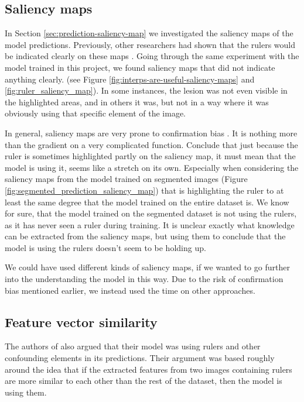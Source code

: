 \subsection{Saliency maps}
In Section \ref{sec:prediction-saliency-map} we investigated the saliency maps of the model predictions.
Previously, other researchers had shown that the rulers would be indicated clearly on these maps \cite{interps-are-useful}.
Going through the same experiment with the model trained in this project, we found saliency maps that did not indicate anything clearly. 
(see Figure \ref{fig:interps-are-useful-saliency-maps} and \ref{fig:ruler_saliency_map}).
In some instances, the lesion was not even visible in the highlighted areas,
and in others it was, but not in a way where it was obviously using that specific element of the image.

In general, saliency maps are very prone to confirmation bias \cite{sanity-checks-for-saliency,Grns2020FaithfulSM}.
It is nothing more than the gradient on a very complicated function.
Conclude that just because the ruler is sometimes highlighted partly on the saliency map,
it must mean that the model is using it, seems like a stretch on its own.
Especially when considering the saliency maps from the model trained on segmented images (Figure 
\ref{fig:segmented_prediction_saliency_map}) that is highlighting the ruler to at least the same degree 
that the model trained on the entire dataset is.
We know for sure, that the model trained on the segmented dataset is not using the rulers,
as it has never seen a ruler during training.
It is unclear exactly what knowledge can be extracted from the saliency maps,
but using them to conclude that the model is using the rulers doesn't seem to be holding up.

We could have used different kinds of saliency maps, if we wanted to go further into the understanding 
the model in this way.
Due to the risk of confirmation bias mentioned earlier, we instead used the time on other approaches.

\subsection{Feature vector similarity}
The authors of \cite{debias-not-so-fast} also argued that their model was using rulers
and other confounding elements in its predictions.
Their argument was based roughly around the idea that if the extracted features from two images
containing rulers are more similar to each other than the rest of the dataset, then the model is using them.

